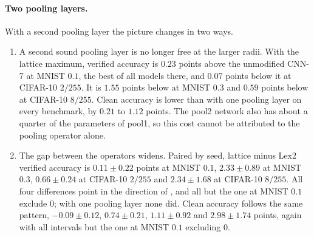 \paragraph{Two pooling layers.} With a second pooling layer the picture changes in two ways.
\begin{enumerate}[leftmargin=*]
\item A second sound pooling layer is no longer free at the larger radii. With the lattice maximum, verified accuracy is $0.23$ points above the unmodified CNN-7 at MNIST $0.1$, the best of all models there, and $0.07$ points below it at CIFAR-10 $2/255$. It is $1.55$ points below at MNIST $0.3$ and $0.59$ points below at CIFAR-10 $8/255$. Clean accuracy is lower than with one pooling layer on every benchmark, by $0.21$ to $1.12$ points. The pool2 network also has about a quarter of the parameters of pool1, so this cost cannot be attributed to the pooling operator alone.
\item The gap between the operators widens. Paired by seed, lattice minus Lex2 verified accuracy is $0.11\pm0.22$ points at MNIST $0.1$, $2.33\pm0.89$ at MNIST $0.3$, $0.66\pm0.24$ at CIFAR-10 $2/255$ and $2.34\pm1.68$ at CIFAR-10 $8/255$. All four differences point in the direction of , and all but the one at MNIST $0.1$ exclude $0$; with one pooling layer none did. Clean accuracy follows the same pattern, $-0.09\pm0.12$, $0.74\pm0.21$, $1.11\pm0.92$ and $2.98\pm1.74$ points, again with all intervals but the one at MNIST $0.1$ excluding $0$.
\end{enumerate}

